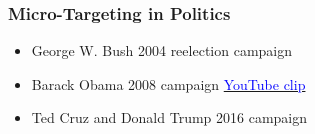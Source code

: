 \begin{frame}
{        \centering
    }

\end{frame}


\begin{frame}
    \frametitle{Micro-Targeting in Politics}
    \begin{itemize}
        \item George W. Bush 2004 reelection campaign
        \item Barack Obama 2008 campaign \href{https://www.youtube.com/watch?time_continue=7&v=BiQwcFRUg_8}{\textcolor{blue}{YouTube clip}}
        \item Ted Cruz and Donald Trump 2016 campaign
    \end{itemize}
\end{frame}

